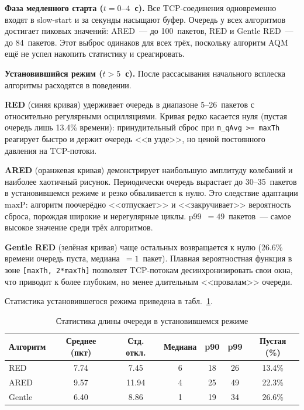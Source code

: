 \documentclass[12pt,a4paper]{article}
\begin{document}
\textbf{Фаза медленного старта ($t = 0$--$4$~с).} Все TCP-соединения одновременно входят в slow-start и за секунды насыщают буфер. Очередь у всех алгоритмов достигает пиковых значений: ARED~--- до 100~пакетов, RED и Gentle RED~--- до 84~пакетов. Этот выброс одинаков для всех трёх, поскольку алгоритм AQM ещё не успел накопить статистику и среагировать.

\textbf{Установившийся режим ($t > 5$~с).} После рассасывания начального всплеска алгоритмы расходятся в поведении.

\textbf{RED} (синяя кривая) удерживает очередь в диапазоне 5--26~пакетов с относительно регулярными осцилляциями. Кривая редко касается нуля (пустая очередь лишь 13.4\% времени): принудительный сброс при \texttt{m\_qAvg >= maxTh} реагирует быстро и держит очередь <<в узде>>, но ценой постоянного давления на TCP-потоки.

\textbf{ARED} (оранжевая кривая) демонстрирует наибольшую амплитуду колебаний и наиболее хаотичный рисунок. Периодически очередь вырастает до 30--35~пакетов в установившемся режиме и резко обваливается к нулю. Это следствие адаптации $\mathrm{maxP}$: алгоритм поочерёдно <<отпускает>> и <<закручивает>> вероятность сброса, порождая широкие и нерегулярные циклы. p99~$= 49$~пакетов~--- самое высокое значение среди трёх алгоритмов.

\textbf{Gentle RED} (зелёная кривая) чаще остальных возвращается к нулю (26.6\% времени очередь пуста, медиана~$= 1$~пакет). Плавная вероятностная функция в зоне \texttt{[maxTh, 2*maxTh]} позволяет TCP-потокам десинхронизировать свои окна, что приводит к более глубоким, но менее длительным <<провалам>> очереди.

Статистика установившегося режима приведена в табл.~\ref{tab:queue-stats}.

\begin{table}[H]
\centering
\caption{Статистика длины очереди в установившемся режиме}
\label{tab:queue-stats}
\begin{tabular}{lcccccc}
\toprule
Алгоритм & Среднее (пкт) & Стд. откл. & Медиана & p90 & p99 & Пустая (\%) \\
\midrule
RED      & 7.74  & 7.45  & 6 & 18 & 26 & 13.4\% \\
ARED     & 9.57  & 11.94 & 4 & 25 & 49 & 22.3\% \\
Gentle   & 6.40  & 8.86  & 1 & 19 & 34 & 26.6\% \\
\bottomrule
\end{tabular}
\end{table}
\end{document}
